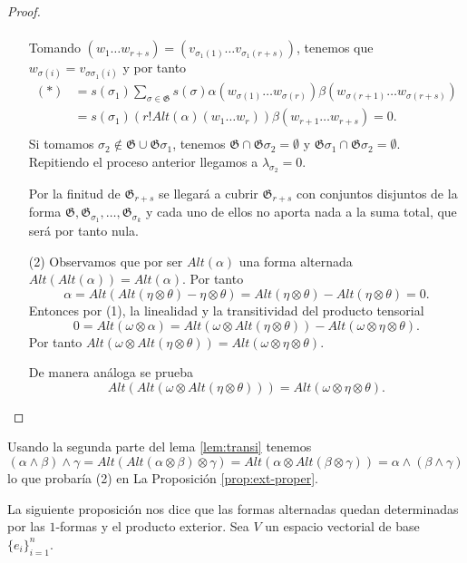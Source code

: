 \documentclass[../VD.tex]{subfiles}
\begin{document}
\begin{proof}
\begin{enumerate}
\begin{align*}
\end{align*}
Tomando \( (w_1\ldots w_{r+s})=(v_{\sigma_1(1)}\ldots v_{\sigma_1(r+s)}) \), tenemos que \( w_{\sigma(i)}=v_{\sigma\sigma_1(i)} \) y por tanto
\begin{align*}
(*)&= s(\sigma_1)\sum_{\sigma\in \mathfrak{G}}s(\sigma)\alpha(w_{\sigma(1)}\ldots w_{\sigma(r)})\beta(w_{\sigma(r+1)}\ldots w_{\sigma(r+s)})\\
&= s(\sigma_1)(r!Alt(\alpha)(w_1\ldots w_r))\beta(w_{r+1}\ldots w_{r+s}) = 0.\\
\end{align*}
Si tomamos \( \sigma_2\notin \mathfrak{G}\cup \mathfrak{G}\sigma_1 \), tenemos \( \mathfrak{G}\cap \mathfrak{G}\sigma_2=\emptyset \) y \( \mathfrak{G}\sigma_1\cap \mathfrak{G}\sigma_2=\emptyset \).\\
Repitiendo el proceso anterior llegamos a \( \lambda_{\sigma_2}=0 \).

Por la finitud de \( \mathfrak{G}_{r+s} \) se llegará a cubrir \( \mathfrak{G}_{r+s} \) con conjuntos disjuntos de la forma \( \mathfrak{G}, \mathfrak{G}_{\sigma_1},\ldots,\mathfrak{G}_{\sigma_k} \) y cada uno de ellos no aporta nada a la suma total, que será por tanto nula.
\item [(2)] Observamos que por ser \( Alt(\alpha) \) una forma alternada \( Alt(Alt(\alpha))=Alt(\alpha) \). Por tanto
\[
\alpha = Alt(Alt(\eta\otimes\theta)-\eta\otimes\theta) = Alt(\eta\otimes\theta)-Alt(\eta\otimes\theta) =0.
\]
Entonces por (1), la linealidad y la transitividad del producto tensorial
\[
0=Alt(\omega\otimes\alpha)=Alt(\omega\otimes Alt(\eta\otimes\theta))-Alt(\omega\otimes\eta\otimes\theta).
\]
Por tanto \( Alt(\omega\otimes Alt(\eta\otimes\theta))=Alt(\omega\otimes\eta\otimes\theta) \).

De manera análoga se prueba 
\[
Alt(Alt(\omega\otimes Alt(\eta\otimes\theta)))=Alt(\omega\otimes\eta\otimes\theta).
 \]
\end{enumerate}
\end{proof}

\begin{note}
Usando la segunda parte del lema \ref{lem:transi} tenemos
\[
(\alpha\wedge\beta)\wedge\gamma=Alt(Alt(\alpha\otimes\beta)\otimes\gamma)=
Alt(\alpha\otimes Alt(\beta\otimes\gamma))=\alpha\wedge(\beta\wedge\gamma)
\]
lo que probaría (2) en La Proposición \ref{prop:ext-proper}.
\end{note}

La siguiente proposición nos dice que las formas alternadas quedan determinadas por las \(1\)-formas y el producto exterior. Sea $V$ un espacio vectorial de base \( \{e_i\}_{i=1}^n \).
\end{document}
